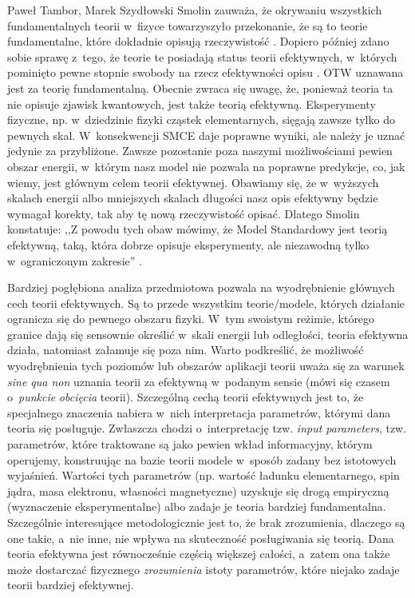 \begin{artplenv}{Paweł Tambor, Marek Szydłowski}
Smolin zauważa, że okrywaniu wszystkich fundamentalnych teorii w~fizyce towarzyszyło przekonanie, że są to teorie fundamentalne, które dokładnie opisują rzeczywistość
\parencite[][s.~163–167]{smolin_czas_2015}. %
 Dopiero później zdano sobie sprawę z~tego, że teorie te posiadają status teorii efektywnych, w~których pominięto pewne stopnie swobody na rzecz efektywności opisu 
\parencite[][]{wilson_non-reductive_2010}. %
 OTW uznawana jest za teorię fundamentalną. Obecnie zwraca się uwagę, że, ponieważ teoria ta nie opisuje zjawisk kwantowych, jest także teorią efektywną. Eksperymenty fizyczne, np. w~dziedzinie fizyki cząstek elementarnych, sięgają zawsze tylko do pewnych skal. W~konsekwencji SMCE daje poprawne wyniki, ale należy je uznać jedynie za przybliżone. Zawsze pozostanie poza naszymi możliwościami pewien obszar energii, w~którym nasz model nie pozwala na poprawne predykcje, co, jak wiemy, jest głównym celem teorii efektywnej. Obawiamy się, że w~wyższych skalach energii albo mniejszych skalach długości nasz opis efektywny będzie wymagał korekty, tak aby tę nową rzeczywistość opisać. Dlatego Smolin konstatuje: ,,Z powodu tych obaw mówimy, że Model Standardowy jest teorią efektywną, taką, która dobrze opisuje eksperymenty, ale niezawodną tylko w~ograniczonym zakresie'' 
\parencite[][s.~164]{smolin_czas_2015}.%


Bardziej pogłębiona analiza przedmiotowa pozwala na wyodrębnienie głównych cech teorii efektywnych. Są to przede wszystkim teorie/modele, których działanie ogranicza się do pewnego obszaru fizyki. W~tym swoistym reżimie, którego granice dają się sensownie określić w~skali energii lub odległości, teoria efektywna działa, natomiast załamuje się poza nim. Warto podkreślić, że możliwość wyodrębnienia tych poziomów lub obszarów aplikacji teorii uważa się za warunek \textit{sine qua non} uznania teorii za efektywną w~podanym sensie (mówi się czasem o~\textit{punkcie} \textit{obcięcia} teorii). Szczególną cechą teorii efektywnych jest to, że specjalnego znaczenia nabiera w~nich interpretacja parametrów, którymi dana teoria się posługuje. Zwłaszcza chodzi o~interpretację tzw. \textit{input parameters}, tzw. parametrów, które traktowane są jako pewien wkład informacyjny, którym operujemy, konstruując na bazie teorii modele w~sposób zadany bez istotowych wyjaśnień. Wartości tych parametrów (np. wartość ładunku elementarnego, spin jądra, masa elektronu, własności magnetyczne) uzyskuje się drogą empiryczną (wyznaczenie eksperymentalne) albo zadaje je teoria bardziej fundamentalna. Szczególnie interesujące metodologicznie jest to, że brak zrozumienia, dlaczego są one takie, a~nie inne, nie wpływa na skuteczność posługiwania się teorią. Dana teoria efektywna jest równocześnie częścią większej całości, a~zatem ona także może dostarczać fizycznego \textit{zrozumienia} istoty parametrów, które niejako zadaje teorii bardziej efektywnej.


\end{artplenv}
